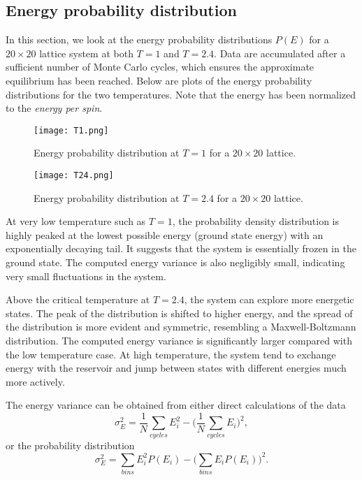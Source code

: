 \documentclass{article}
\begin{document}
\subsection{Energy probability distribution}
In this section, we look at the energy probability distributions $P(E)$ for a $20\times20$ lattice system at both $T=1$ and $T=2.4$. Data are accumulated after a sufficient number of Monte Carlo cycles, which ensures the approximate equilibrium has been reached. Below are plots of the energy probability distributions for the two temperatures. Note that the energy has been normalized to the \emph{energy per spin}.

\begin{figure}[h]
\begin{center}
\texttt{[image: T1.png]}
\caption{Energy probability distribution at $T=1$ for a $20\times20$ lattice.}
\end{center}
\end{figure}

\begin{figure}[h]
\begin{center}
\texttt{[image: T24.png]}
\caption{Energy probability distribution at $T=2.4$ for a $20\times20$ lattice.}
\end{center}
\end{figure}

At very low temperature such as $T=1$, the probability density distribution is highly peaked at the lowest possible energy (ground state energy) with an exponentially decaying tail. It suggests that the system is essentially frozen in the ground state. The computed energy variance is also negligibly small, indicating very small fluctuations in the system. 

Above the critical temperature at $T=2.4$, the system can explore more energetic states. The peak of the distribution is shifted to higher energy, and the spread of the distribution is more evident and symmetric, resembling a Maxwell-Boltzmann distribution. The computed energy variance is significantly larger compared with the low temperature case. At high temperature, the system tend to exchange energy with the reservoir and jump between states with different energies much more actively.

The energy variance can be obtained from either direct calculations of the data
\begin{equation*}
\sigma_{E}^2 = \frac{1}{N}\sum_{cycles}E_{i}^{2} - \big(\frac{1}{N}\sum_{cycles}E_{i}\big)^2,
\end{equation*}
or the probability distribution
\begin{equation*}
\sigma_{E}^2 = \sum_{bins}E_{i}^{2}P(E_i) - \big(\sum_{bins}E_{i}P(E_i)\big)^2.
\end{equation*}
\end{document}
